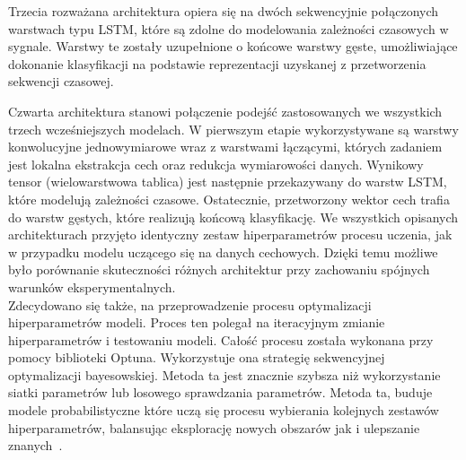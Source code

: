 \documentclass[a4paper,twoside,12pt]{book}
\begin{document}
Trzecia rozważana architektura opiera się na dwóch sekwencyjnie połączonych warstwach typu LSTM, które są zdolne do modelowania zależności czasowych w sygnale. Warstwy te zostały uzupełnione o końcowe warstwy gęste, umożliwiające dokonanie klasyfikacji na podstawie reprezentacji uzyskanej z przetworzenia sekwencji czasowej.

Czwarta architektura stanowi połączenie podejść zastosowanych we wszystkich trzech wcześniejszych modelach. W pierwszym etapie wykorzystywane są warstwy konwolucyjne jednowymiarowe wraz z warstwami łączącymi, których zadaniem jest lokalna ekstrakcja cech oraz redukcja wymiarowości danych. Wynikowy tensor (wielowarstwowa tablica) jest następnie przekazywany do warstw LSTM, które modelują zależności czasowe. Ostatecznie, przetworzony wektor cech trafia do warstw gęstych, które realizują końcową klasyfikację.
We wszystkich opisanych architekturach przyjęto identyczny zestaw hiperparametrów procesu uczenia, jak w przypadku modelu uczącego się na danych cechowych. Dzięki temu możliwe było porównanie skuteczności różnych architektur przy zachowaniu spójnych warunków eksperymentalnych.\\

Zdecydowano się także, na przeprowadzenie procesu optymalizacji hiperparametrów modeli. Proces ten polegał na iteracyjnym zmianie hiperparametrów i testowaniu modeli. Całość procesu została wykonana przy pomocy biblioteki Optuna. Wykorzystuje ona strategię sekwencyjnej optymalizacji bayesowskiej. Metoda ta jest znacznie szybsza niż wykorzystanie siatki parametrów lub losowego sprawdzania parametrów. Metoda ta, buduje modele probabilistyczne które uczą się procesu wybierania kolejnych zestawów hiperparametrów, balansując eksplorację nowych obszarów jak i ulepszanie znanych~\cite{optuna_2019}.
\end{document}
